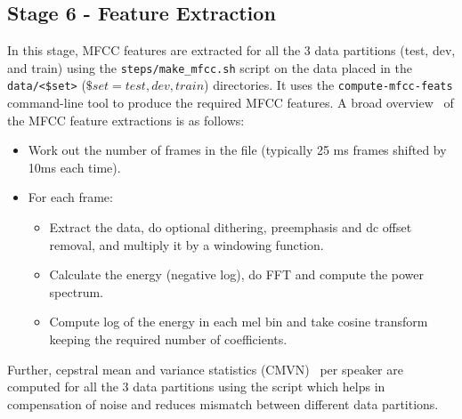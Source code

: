 \subsection{ Stage 6 - Feature Extraction }


In this stage, MFCC features are extracted for all the 3 data partitions (test, dev, and train) 
using the \texttt{steps/make\_mfcc.sh} script on the data placed in the \texttt{data/<\$set>} 
($\$set = {test,dev,train}$) directories. It uses the \texttt{compute-mfcc-feats} command-line tool
to produce the required MFCC features. A broad overview~\cite{mfcc} of the MFCC feature extractions is as follows:
\begin{itemize}
    \item Work out the number of frames in the file (typically 25 ms frames shifted by 10ms each time).
    \item For each frame: 
        \begin{itemize}
         \item Extract the data, do optional dithering, preemphasis and dc offset removal, and multiply it by a windowing function.
         \item Calculate the energy (negative log), do FFT and compute the power spectrum.
         \item Compute log of the energy in each mel bin and take cosine transform keeping the required number of coefficients.
        \end{itemize}
\end{itemize}
Further, cepstral mean and variance statistics (CMVN)~\cite{kaldicmvn} per speaker are computed for all the 3 data partitions using the  script which helps in compensation of noise and reduces mismatch between different data partitions.